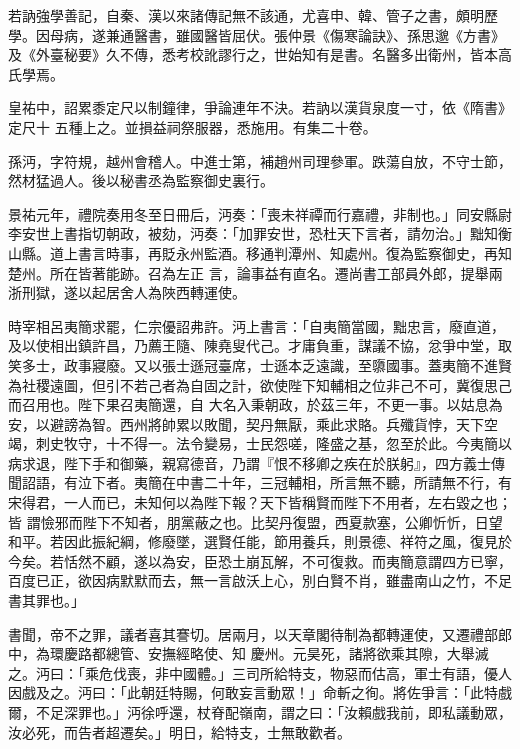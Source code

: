 \begin{pinyinscope}
 若訥強學善記，自秦、漢以來諸傳記無不該通，尤喜申、韓、管子之書，頗明歷學。因母病，遂兼通醫書，雖國醫皆屈伏。張仲景《傷寒論訣》、孫思邈《方書》及《外臺秘要》久不傳，悉考校訛謬行之，世始知有是書。名醫多出衛州，皆本高氏學焉。



 皇祐中，詔累黍定尺以制鐘律，爭論連年不決。若訥以漢貨泉度一寸，依《隋書》定尺十
 五種上之。並損益祠祭服器，悉施用。有集二十卷。



 孫沔，字符規，越州會稽人。中進士第，補趙州司理參軍。跌蕩自放，不守士節，然材猛過人。後以秘書丞為監察御史裏行。



 景祐元年，禮院奏用冬至日冊后，沔奏：「喪未祥禫而行嘉禮，非制也。」同安縣尉李安世上書指切朝政，被劾，沔奏：「加罪安世，恐杜天下言者，請勿治。」黜知衡山縣。道上書言時事，再貶永州監酒。移通判潭州、知處州。復為監察御史，再知楚州。所在皆著能跡。召為左正
 言，論事益有直名。遷尚書工部員外郎，提舉兩浙刑獄，遂以起居舍人為陜西轉運使。



 時宰相呂夷簡求罷，仁宗優詔弗許。沔上書言：「自夷簡當國，黜忠言，廢直道，及以使相出鎮許昌，乃薦王隨、陳堯叟代己。才庸負重，謀議不協，忿爭中堂，取笑多士，政事寢廢。又以張士遜冠臺席，士遜本乏遠識，至隳國事。蓋夷簡不進賢為社稷遠圖，但引不若己者為自固之計，欲使陛下知輔相之位非己不可，冀復思己而召用也。陛下果召夷簡還，自
 大名入秉朝政，於茲三年，不更一事。以姑息為安，以避謗為智。西州將帥累以敗聞，契丹無厭，乘此求賂。兵殲貨悖，天下空竭，刺史牧守，十不得一。法令變易，士民怨嗟，隆盛之基，忽至於此。今夷簡以病求退，陛下手和御藥，親寫德音，乃謂『恨不移卿之疾在於朕躬』，四方義士傳聞詔語，有泣下者。夷簡在中書二十年，三冠輔相，所言無不聽，所請無不行，有宋得君，一人而已，未知何以為陛下報？天下皆稱賢而陛下不用者，左右毀之也；皆
 謂憸邪而陛下不知者，朋黨蔽之也。比契丹復盟，西夏款塞，公卿忻忻，日望和平。若因此振紀綱，修廢墜，選賢任能，節用養兵，則景德、祥符之風，復見於今矣。若恬然不顧，遂以為安，臣恐土崩瓦解，不可復救。而夷簡意謂四方已寧，百度已正，欲因病默默而去，無一言啟沃上心，別白賢不肖，雖盡南山之竹，不足書其罪也。」



 書聞，帝不之罪，議者喜其謇切。居兩月，以天章閣待制為都轉運使，又遷禮部郎中，為環慶路都總管、安撫經略使、知
 慶州。元昊死，諸將欲乘其隙，大舉滅之。沔曰：「乘危伐喪，非中國體。」三司所給特支，物惡而估高，軍士有語，優人因戲及之。沔曰：「此朝廷特賜，何敢妄言動眾！」命斬之徇。將佐爭言：「此特戲爾，不足深罪也。」沔徐呼還，杖脊配嶺南，謂之曰：「汝賴戲我前，即私議動眾，汝必死，而告者超遷矣。」明日，給特支，士無敢歡者。




\end{pinyinscope}
